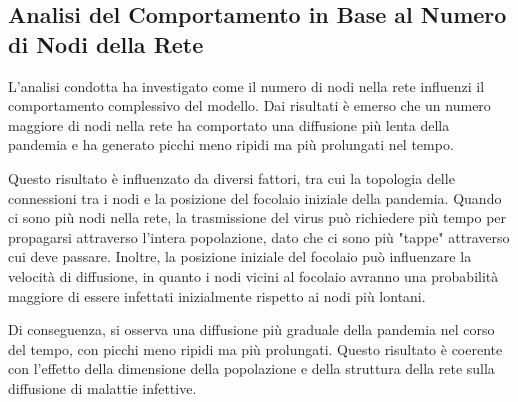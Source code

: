 \subsection{Analisi del Comportamento in Base al Numero di Nodi della Rete}

L'analisi condotta ha investigato come il numero di nodi nella rete 
influenzi il comportamento complessivo del modello. 
Dai risultati è emerso che un numero maggiore di nodi nella rete ha 
comportato una diffusione più lenta della pandemia e ha generato picchi 
meno ripidi ma più prolungati nel tempo.

Questo risultato è influenzato da diversi fattori, tra cui la 
topologia delle connessioni tra i nodi e la posizione del focolaio 
iniziale della pandemia. Quando ci sono più nodi nella rete, 
la trasmissione del virus può richiedere più tempo per propagarsi 
attraverso l'intera popolazione, dato che ci sono più "tappe" attraverso 
cui deve passare. Inoltre, la posizione iniziale del focolaio può 
influenzare la velocità di diffusione, in quanto i nodi vicini al 
focolaio avranno una probabilità maggiore di essere infettati 
inizialmente rispetto ai nodi più lontani.

Di conseguenza, si osserva una diffusione più graduale della pandemia 
nel corso del tempo, con picchi meno ripidi ma più prolungati. 
Questo risultato è coerente con l'effetto della dimensione della 
popolazione e della struttura della rete sulla diffusione di malattie 
infettive.

